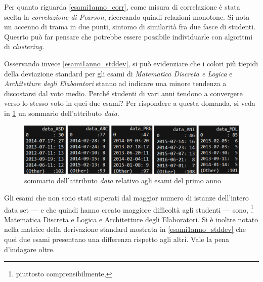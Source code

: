 Per quanto riguarda \ref{esami1anno_corr}, come misura di correlazione è stata scelta la \textit{correlazione di Pearson}, ricercando quindi relazioni monotone. Si nota un accenno di trama in due punti, sintomo di similarità fra due fasce di studenti. Quesrto può far pensare che potrebbe essere possibile individuarle con algoritmi di \textit{clustering}.

Osservando invece  \ref{esami1anno_stddev}, si può evidenziare che i colori più tiepidi della deviazione standard per gli esami di \textit{Matematica Discreta e Logica} e \textit{Architetture degli Elaboratori} stanno ad indicare una minore tendenza a discostarsi dal voto medio. Perché studenti di vari anni tendono a convergere verso lo stesso voto in quei due esami? Per rispondere a questa domanda, si veda in \ref{1annosommario} un sommario dell'attributo \textit{data}.

\begin{figure}
    \centering
    \caption{sommario dell'attributo \textit{data} relativo agli esami del primo anno}
    \label{1annosommario}
	\includegraphics[scale=0.8]{img/sommario_1_anno.png}
\end{figure}

Gli esami che non sono stati superati dal maggior numero di istanze dell’intero data set --- e che quindi hanno creato maggiore difficoltà agli studenti --- sono, \footnote{piuttosto comprensibilmente,} Matematica Discreta e Logica e Architetture degli Elaboratori. Si è inoltre notato nella matrice della derivazione standard mostrata in \ref{esami1anno_stddev} che quei due esami presentano una differenza rispetto agli altri. Vale la pena d'indagare oltre.

